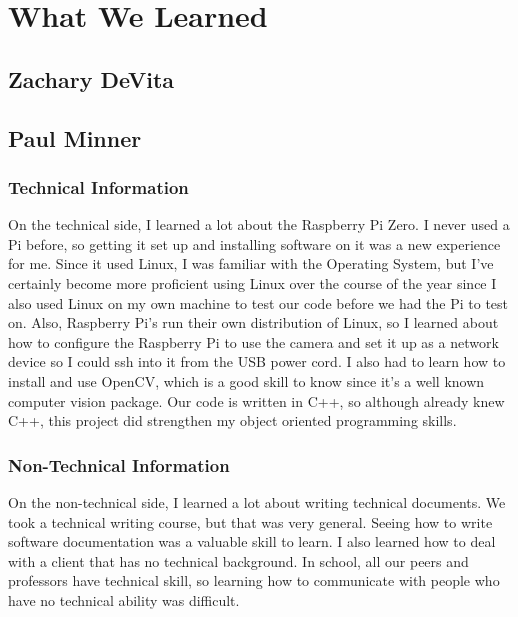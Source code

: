 \documentclass[10pt,letterpaper,onecolumn,draftclsnofoot,journal]{IEEEtran}
\begin{document}
\section{\textbf{What We Learned}}

\subsection{\textbf{Zachary DeVita}}

\subsection{\textbf{Paul Minner}}
\subsubsection{\textbf{Technical Information}}
On the technical side, I learned a lot about the Raspberry Pi Zero. I never used a Pi before, so getting it set up and installing software on it was a new experience for me. Since it used Linux, I was familiar with the Operating System, but I've certainly become more proficient using Linux over the course of the year since I also used Linux on my own machine to test our code before we had the Pi to test on. Also, Raspberry Pi's run their own distribution of Linux, so I learned about how to configure the Raspberry Pi to use the camera and set it up as a network device so I could ssh into it from the USB power cord. I also had to learn how to install and use OpenCV, which is a good skill to know since it's a well known computer vision package. Our code is written in C++, so although already knew C++, this project did strengthen my object oriented programming skills.\vspace{.3cm}

\subsubsection{\textbf{Non-Technical Information}}
On the non-technical side, I learned a lot about writing technical documents. We took a technical writing course, but that was very general. Seeing how to write software documentation was a valuable skill to learn. I also learned how to deal with a client that has no technical background. In school, all our peers and professors have technical skill, so learning how to communicate with people who have no technical ability was difficult.\vspace{.3cm}
\end{document}
